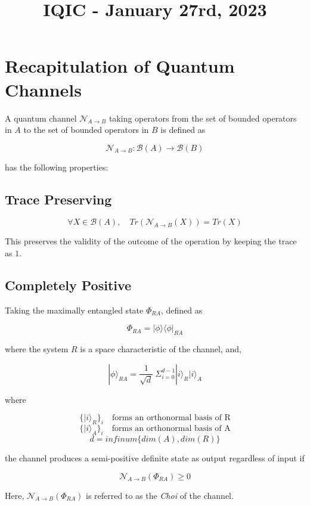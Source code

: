 \documentclass{article}
\title{IQIC - January 27rd, 2023}
\begin{document}
\maketitle

\section{Recapitulation of Quantum Channels}

A quantum channel $\mathcal{N}_{A \rightarrow B}$ taking operators from the set of bounded operators in $A$ to the set of bounded operators in $B$ is defined as

\[\mathcal{N}_{A \rightarrow B} : \mathcal{B}(A) \rightarrow \mathcal{B}(B)\]

has the following properties: 

\subsection{Trace Preserving}

\[\forall X \in \mathcal{B}(A),\quad Tr(\mathcal{N}_{A \rightarrow B}(X))=Tr(X) \]

This preserves the validity of the outcome of the operation by keeping the trace as $1$.

\subsection{Completely Positive}

Taking the maximally entangled state $\Phi_{RA}$, defined as 

\[\Phi_{RA} = | \phi \rangle \langle \phi | _{RA}\]

where the system $R$ is a space characteristic of the channel, and,

\[| \phi \rangle _{RA} = \frac{1}{\sqrt{d}}\ \Sigma^{d-1}_{i=0} | i \rangle_R | i \rangle_A \]

where 

\[ \{| i \rangle_R \}_i \quad \textrm{forms an orthonormal basis of R} \]
\[ \{| i \rangle_A \}_i \quad \textrm{forms an orthonormal basis of A} \]
\[d = infinum\{ dim(A), dim(R)\}\]

the channel produces a semi-positive definite state as output regardless of input if 

\[ \mathcal{N}_{A \rightarrow B}(\Phi_{RA}) 	\geq 0 \]

 Here, $\mathcal{N}_{A \rightarrow B}(\Phi_{RA})$ is referred to as the \emph{Choi} of the channel.
\end{document}
